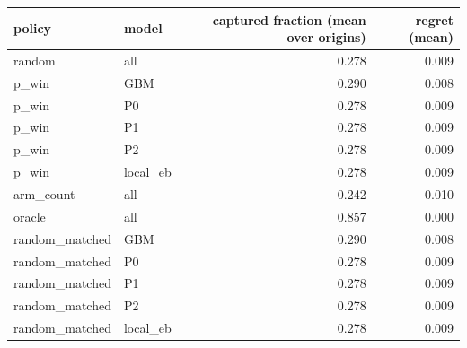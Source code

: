 \begin{tabular}{llrr}
\toprule
policy & model & captured fraction (mean over origins) & regret (mean) \\
\midrule
random & all & 0.278 & 0.009 \\
p\_win & GBM & 0.290 & 0.008 \\
p\_win & P0 & 0.278 & 0.009 \\
p\_win & P1 & 0.278 & 0.009 \\
p\_win & P2 & 0.278 & 0.009 \\
p\_win & local\_eb & 0.278 & 0.009 \\
arm\_count & all & 0.242 & 0.010 \\
oracle & all & 0.857 & 0.000 \\
random\_matched & GBM & 0.290 & 0.008 \\
random\_matched & P0 & 0.278 & 0.009 \\
random\_matched & P1 & 0.278 & 0.009 \\
random\_matched & P2 & 0.278 & 0.009 \\
random\_matched & local\_eb & 0.278 & 0.009 \\
\bottomrule
\end{tabular}
